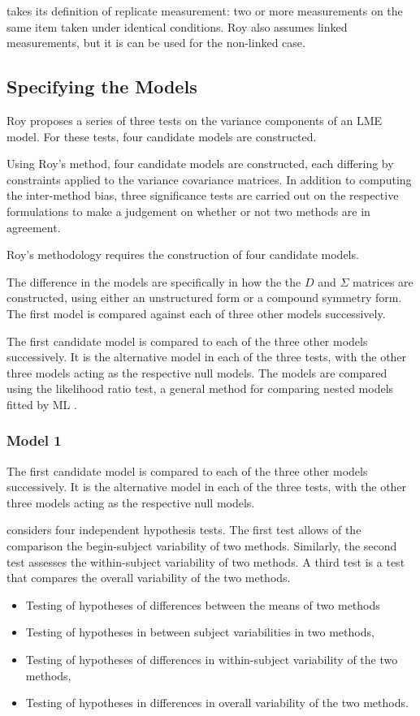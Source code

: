\documentclass[12pt, a4paper]{report}
\theoremstyle{plain}
\theoremstyle{definition}
\theoremstyle{remark}
\begin{document}
	
	\citet{ARoy2009} takes its definition of replicate measurement: two or more measurements on the same item taken
	under identical conditions. Roy also assumes linked measurements, but it is can be used for the non-linked case.
	

	\subsection{Specifying the Models}
	Roy proposes a series of three tests on the variance components of an LME model. For these tests, four candidate models are constructed. 
	
	Using Roy's method, four candidate models are constructed, each differing by constraints applied to the variance covariance matrices. In addition to computing the inter-method bias, three significance tests are carried out on the respective formulations to make a judgement on whether or not two methods are in agreement.
	
		Roy's methodology requires the construction of four candidate models. 
		
	The difference in the models are specifically in how the the $D$ and $\Sigma$ matrices are constructed, using either an unstructured form or a compound symmetry form. The first model is compared against each of three other models successively.
		
		The first candidate model is compared to each of the three other models successively. It is the alternative model in each of the three tests, with the other three models acting as the respective null models. The models are compared using the likelihood ratio test, a general method for comparing nested models fitted by ML \citep{Lehmann2006}.
		
		
	\subsubsection{Model 1}
	The first candidate model is compared to each of the three other models successively. It is the alternative model in each of the three tests, with the other three models acting as the respective null models.
	
	
	\citet{ARoy2009} considers four independent hypothesis tests. The first test allows of the comparison the begin-subject variability of two methods. Similarly, the second test assesses the within-subject variability of two methods. A third test is a test that compares the overall variability of the two methods.
	\begin{itemize}
		\item Testing of hypotheses of differences between the means of
		two methods\item Testing of hypotheses in between subject
		variabilities in two methods, \item Testing of hypotheses of
		differences in within-subject variability of the two methods,
		\item Testing of hypotheses in differences in overall variability
		of the two methods.
	\end{itemize}
	
\end{document}

